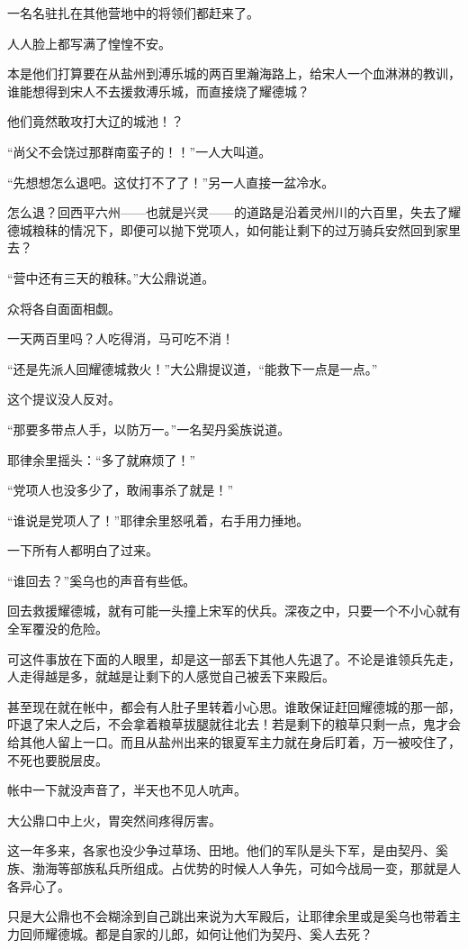 一名名驻扎在其他营地中的将领们都赶来了。

人人脸上都写满了惶惶不安。

本是他们打算要在从盐州到溥乐城的两百里瀚海路上，给宋人一个血淋淋的教训，谁能想得到宋人不去援救溥乐城，而直接烧了耀德城？

他们竟然敢攻打大辽的城池！？

“尚父不会饶过那群南蛮子的！！”一人大叫道。

“先想想怎么退吧。这仗打不了了！”另一人直接一盆冷水。

怎么退？回西平六州——也就是兴灵——的道路是沿着灵州川的六百里，失去了耀德城粮秣的情况下，即便可以抛下党项人，如何能让剩下的过万骑兵安然回到家里去？

“营中还有三天的粮秣。”大公鼎说道。

众将各自面面相觑。

一天两百里吗？人吃得消，马可吃不消！

“还是先派人回耀德城救火！”大公鼎提议道，“能救下一点是一点。”

这个提议没人反对。

“那要多带点人手，以防万一。”一名契丹奚族说道。

耶律余里摇头：“多了就麻烦了！”

“党项人也没多少了，敢闹事杀了就是！”

“谁说是党项人了！”耶律余里怒吼着，右手用力捶地。

一下所有人都明白了过来。

“谁回去？”奚乌也的声音有些低。

回去救援耀德城，就有可能一头撞上宋军的伏兵。深夜之中，只要一个不小心就有全军覆没的危险。

可这件事放在下面的人眼里，却是这一部丢下其他人先退了。不论是谁领兵先走，人走得越是多，就越是让剩下的人感觉自己被丢下来殿后。

甚至现在就在帐中，都会有人肚子里转着小心思。谁敢保证赶回耀德城的那一部，吓退了宋人之后，不会拿着粮草拔腿就往北去！若是剩下的粮草只剩一点，鬼才会给其他人留上一口。而且从盐州出来的银夏军主力就在身后盯着，万一被咬住了，不死也要脱层皮。

帐中一下就没声音了，半天也不见人吭声。

大公鼎口中上火，胃突然间疼得厉害。

这一年多来，各家也没少争过草场、田地。他们的军队是头下军，是由契丹、奚族、渤海等部族私兵所组成。占优势的时候人人争先，可如今战局一变，那就是人各异心了。

只是大公鼎也不会糊涂到自己跳出来说为大军殿后，让耶律余里或是奚乌也带着主力回师耀德城。都是自家的儿郎，如何让他们为契丹、奚人去死？


